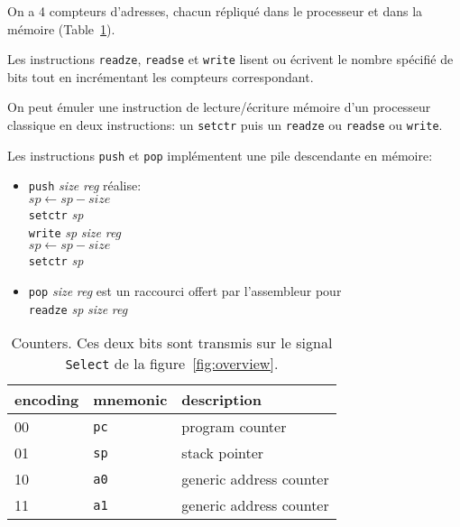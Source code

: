 \documentclass[architecture]{compas2018}
\begin{document}
On a 4 compteurs d'adresses, chacun  répliqué dans le processeur et dans la mémoire (Table~\ref{tab:counters}).


Les instructions \texttt{readze}, \texttt{readse} et \texttt{write} lisent ou écrivent le nombre spécifié de bits tout en incrémentant les compteurs correspondant.

On peut émuler une instruction de lecture/écriture mémoire d'un processeur classique en deux instructions: un \texttt{setctr} puis un \texttt{readze} ou \texttt{readse} ou \texttt{write}.

Les instructions \texttt{push} et \texttt{pop} implémentent une pile descendante en mémoire: 
\begin{itemize}
\item \texttt{push} \emph{size} \emph{reg} réalise: \\
  $\mathit{sp}\leftarrow \mathit{sp}-\mathit{size}$\\ \texttt{setctr} \textit{sp}\\ \texttt{write}  \textit{sp} \textit{size} \textit{reg} \\   $\mathit{sp}\leftarrow \mathit{sp}-\mathit{size}$\\ \texttt{setctr} \textit{sp}
\item \texttt{pop} \emph{size} \emph{reg} est un raccourci offert par l'assembleur pour \\\texttt{readze} \textit{sp} \emph{size} \emph{reg}\\
  
\end{itemize}

\begin{table} 
  \caption{Counters. Ces deux bits sont transmis sur le signal \texttt{Select} de la figure~\ref{fig:overview}. }
  \label{tab:counters}
\begin{center}
  \begin{tabular}{|l|l|l|}
    \hline  
  encoding  & mnemonic & description \\
    \hline  
    \hline  
    00& \texttt{pc} &  program counter\\
    \hline
    01& \texttt{sp} & stack pointer\\
    \hline
    10& \texttt{a0} &  generic address counter\\
    \hline
    11& \texttt{a1} &  generic address counter\\
    \hline
  \end{tabular}
\end{center}
\end{table}
\end{document}
